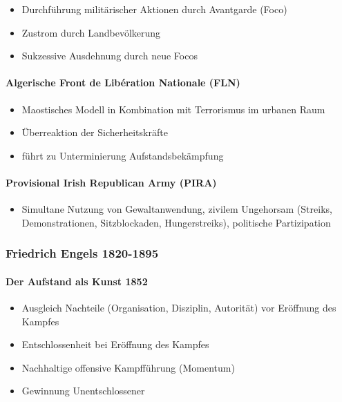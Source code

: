 {}\documentclass[a4paper]{article}
\providecommand{\tightlist}{\setlength{\itemsep}{1mm}\setlength{\parskip}{1mm}}
\begin{document}
\begin{itemize}
	\tightlist
	\item
	      Durchführung militärischer Aktionen durch Avantgarde (Foco)
	\item
	      Zustrom durch Landbevölkerung
	\item
	      Sukzessive Ausdehnung durch neue Focos
\end{itemize}

\paragraph{Algerische Front de Libération Nationale
	(FLN)}\label{algerische-front-de-libuxe9ration-nationale-fln}

\begin{itemize}
	\tightlist
	\item
	      Maostisches Modell in Kombination mit Terrorismus im urbanen Raum
	\item
	      Überreaktion der Sicherheitskräfte
	\item
	      führt zu Unterminierung Aufstandsbekämpfung
\end{itemize}

\paragraph{Provisional Irish Republican Army
	(PIRA)}\label{provisional-irish-republican-army-pira}

\begin{itemize}
	\tightlist
	\item
	      Simultane Nutzung von Gewaltanwendung, zivilem Ungehorsam (Streiks,
	      Demonstrationen, Sitzblockaden, Hungerstreiks), politische
	      Partizipation
\end{itemize}

\subsubsection{Friedrich Engels
	1820-1895}\label{friedrich-engels-1820-1895}

\paragraph{Der Aufstand als Kunst
	1852}\label{der-aufstand-als-kunst-1852}

\begin{itemize}
	\tightlist
	\item
	      Ausgleich Nachteile (Organisation, Disziplin, Autorität) vor Eröffnung
	      des Kampfes
	\item
	      Entschlossenheit bei Eröffnung des Kampfes
	\item
	      Nachhaltige offensive Kampfführung (Momentum)
	\item
	      Gewinnung Unentschlossener
\end{itemize}
\end{document}
